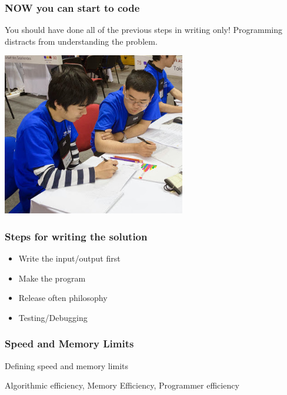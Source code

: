 \documentclass{beamer}
\begin{document}
\begin{frame}
  \frametitle{NOW you can start to code}

  You should have done all of the previous steps in writing only!
  Programming distracts from understanding the problem.
  
  \includegraphics[width=0.6\textwidth]{img/writing}
\end{frame}

\begin{frame}
  \frametitle{Steps for writing the solution}
  \begin{itemize}
    \item Write the input/output first %
      
    \item Make the program %
    \item Release often philosophy %
    \item Testing/Debugging
  \end{itemize}
\end{frame}

\begin{frame}
  \frametitle{Speed and Memory Limits}
  Defining speed and memory limits

  Algorithmic efficiency, Memory Efficiency, Programmer efficiency


\end{frame}
\end{document}
